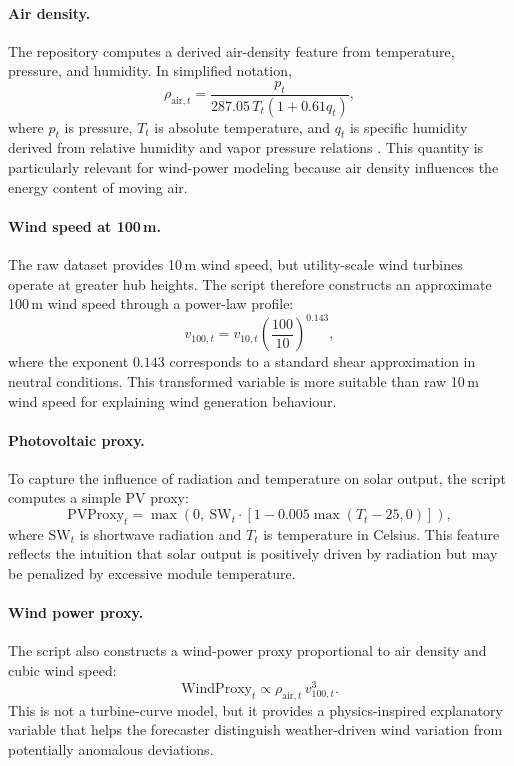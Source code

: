 \paragraph{Air density.}
The repository computes a derived air-density feature from temperature, pressure, and humidity. In simplified notation,
\begin{equation}
	\rho_{\mathrm{air},t} =
	\frac{p_t}{287.05 \, T_t \left(1 + 0.61 q_t\right)},
	\label{eq:air_density}
\end{equation}
where $p_t$ is pressure, $T_t$ is absolute temperature, and $q_t$ is specific humidity derived from relative humidity and vapor pressure relations \cite{repo_thesis_grid_anomaly}. This quantity is particularly relevant for wind-power modeling because air density influences the energy content of moving air.

\paragraph{Wind speed at 100\,m.}
The raw dataset provides 10\,m wind speed, but utility-scale wind turbines operate at greater hub heights. The script therefore constructs an approximate 100\,m wind speed through a power-law profile:
\begin{equation}
	v_{100,t} = v_{10,t}\left(\frac{100}{10}\right)^{0.143},
	\label{eq:wind100}
\end{equation}
where the exponent $0.143$ corresponds to a standard shear approximation in neutral conditions. This transformed variable is more suitable than raw 10\,m wind speed for explaining wind generation behaviour.

\paragraph{Photovoltaic proxy.}
To capture the influence of radiation and temperature on solar output, the script computes a simple PV proxy:
\begin{equation}
	\mathrm{PVProxy}_t =
	\max\!\left(0,\ \mathrm{SW}_t \cdot \left[1 - 0.005\max(T_t - 25, 0)\right]\right),
	\label{eq:pv_proxy}
\end{equation}
where $\mathrm{SW}_t$ is shortwave radiation and $T_t$ is temperature in Celsius. This feature reflects the intuition that solar output is positively driven by radiation but may be penalized by excessive module temperature.

\paragraph{Wind power proxy.}
The script also constructs a wind-power proxy proportional to air density and cubic wind speed:
\begin{equation}
	\mathrm{WindProxy}_t \propto \rho_{\mathrm{air},t}\, v_{100,t}^{3}.
	\label{eq:wind_proxy}
\end{equation}
This is not a turbine-curve model, but it provides a physics-inspired explanatory variable that helps the forecaster distinguish weather-driven wind variation from potentially anomalous deviations.

